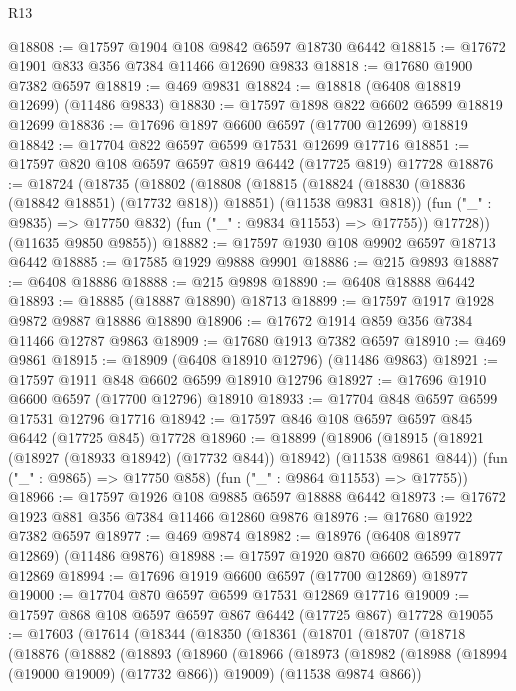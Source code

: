 \begin{lexlean}{R13}
\begin{coremodule}
@18808 := @17597 @1904 @108 @9842 @6597 @18730 @6442
@18815 := @17672 @1901 @833 @356 @7384 @11466 @12690 @9833
@18818 := @17680 @1900 @7382 @6597
@18819 := @469 @9831
@18824 := @18818 (@6408 @18819 @12699) (@11486 @9833)
@18830 := @17597 @1898 @822 @6602 @6599 @18819 @12699
@18836 := @17696 @1897 @6600 @6597 (@17700 @12699) @18819
@18842 := @17704 @822 @6597 @6599 @17531 @12699 @17716
@18851 := @17597 @820 @108 @6597 @6597 @819 @6442 (@17725 @819) @17728
@18876 := @18724
    (@18735
      (@18802
        (@18808
          (@18815
            (@18824 (@18830 (@18836 (@18842 @18851) (@17732 @818)) @18851) (@11538 @9831 @818))
            (fun ("_" : @9835) => @17750 @832)
            (fun ("_" : @9834 @11553) => @17755))
          @17728))
      (@11635 @9850 @9855))
@18882 := @17597 @1930 @108 @9902 @6597 @18713 @6442
@18885 := @17585 @1929 @9888 @9901
@18886 := @215 @9893
@18887 := @6408 @18886
@18888 := @215 @9898
@18890 := @6408 @18888 @6442
@18893 := @18885 (@18887 @18890) @18713
@18899 := @17597 @1917 @1928 @9872 @9887 @18886 @18890
@18906 := @17672 @1914 @859 @356 @7384 @11466 @12787 @9863
@18909 := @17680 @1913 @7382 @6597
@18910 := @469 @9861
@18915 := @18909 (@6408 @18910 @12796) (@11486 @9863)
@18921 := @17597 @1911 @848 @6602 @6599 @18910 @12796
@18927 := @17696 @1910 @6600 @6597 (@17700 @12796) @18910
@18933 := @17704 @848 @6597 @6599 @17531 @12796 @17716
@18942 := @17597 @846 @108 @6597 @6597 @845 @6442 (@17725 @845) @17728
@18960 := @18899
    (@18906
      (@18915 (@18921 (@18927 (@18933 @18942) (@17732 @844)) @18942) (@11538 @9861 @844))
      (fun ("_" : @9865) => @17750 @858)
      (fun ("_" : @9864 @11553) => @17755))
@18966 := @17597 @1926 @108 @9885 @6597 @18888 @6442
@18973 := @17672 @1923 @881 @356 @7384 @11466 @12860 @9876
@18976 := @17680 @1922 @7382 @6597
@18977 := @469 @9874
@18982 := @18976 (@6408 @18977 @12869) (@11486 @9876)
@18988 := @17597 @1920 @870 @6602 @6599 @18977 @12869
@18994 := @17696 @1919 @6600 @6597 (@17700 @12869) @18977
@19000 := @17704 @870 @6597 @6599 @17531 @12869 @17716
@19009 := @17597 @868 @108 @6597 @6597 @867 @6442 (@17725 @867) @17728
@19055 := @17603
    (@17614
      (@18344
        (@18350
          (@18361
            (@18701
              (@18707
                (@18718
                  (@18876
                    (@18882
                      (@18893
                        (@18960
                          (@18966
                            (@18973
                              (@18982
                                (@18988 (@18994 (@19000 @19009) (@17732 @866)) @19009)
                                (@11538 @9874 @866))

\end{coremodule}
\end{lexlean}
